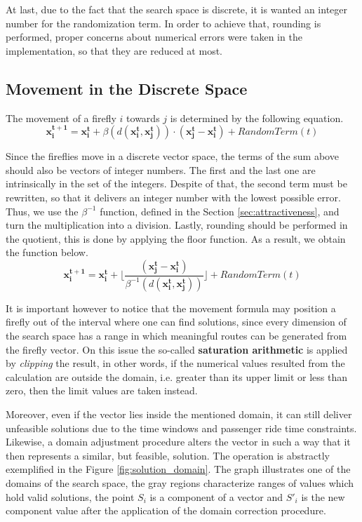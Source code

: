 \documentclass[tuberlin,cic,tc,openright,english,noabntcite,oneside]{iiufrgs}
\begin{document}
At last, due to the fact that the search space is discrete, it is wanted an integer number for the randomization term. In order to achieve that, rounding is performed, proper concerns about numerical errors were taken in the implementation, so that they are reduced at most.

\subsection{Movement in the Discrete Space}
The movement of a firefly $i$ towards $j$ is determined by the following equation.
$$\mathbf{x^{t+1}_i} = \mathbf{x^{t}_i} + \beta(d(\mathbf{x^{t}_i}, \mathbf{x^{t}_j})) \cdot (\mathbf{x^{t}_j} - \mathbf{x^{t}_i}) + RandomTerm(t)$$

Since the fireflies move in a discrete vector space, the terms of the sum above should also be vectors of integer numbers. The first and the last one are intrinsically in the set of the integers. Despite of that, the second term must be rewritten, so that it delivers an integer number with the lowest possible error. Thus, we use the $\beta^{-1}$ function, defined in the Section \ref{sec:attractiveness}, and turn the multiplication into a division. Lastly, rounding should be performed in the quotient, this is done by applying the floor function. As a result, we obtain the function below.
$$\mathbf{x^{t+1}_i} = \mathbf{x^{t}_i} +  \lfloor \frac{(\mathbf{x^{t}_j} - \mathbf{x^{t}_i})}{\beta^{-1}(d(\mathbf{x^{t}_i}, \mathbf{x^{t}_j}))} \rfloor + RandomTerm(t)$$

It is important however to notice that the movement formula may position a firefly out of the interval where one can find solutions, since every dimension of the search space has a range in which meaningful routes can be generated from the firefly vector. On this issue the so-called \textbf{saturation arithmetic} is applied by \emph{clipping} the result, in other words, if the numerical values resulted from the calculation are outside the domain, i.e. greater than its upper limit or less than zero, then the limit values are taken instead.

Moreover, even if the vector lies inside the mentioned domain, it can still deliver unfeasible solutions due to the time windows and passenger ride time constraints. Likewise, a domain adjustment procedure alters the vector in such a way that it then represents a similar, but feasible, solution. The operation is abstractly exemplified in the Figure \ref{fig:solution_domain}. The graph illustrates one of the domains of the search space, the gray regions characterize ranges of values which hold valid solutions, the point $S_i$ is a component of a vector and $S'_i$ is the new component value after the application of the domain correction procedure.
\end{document}
